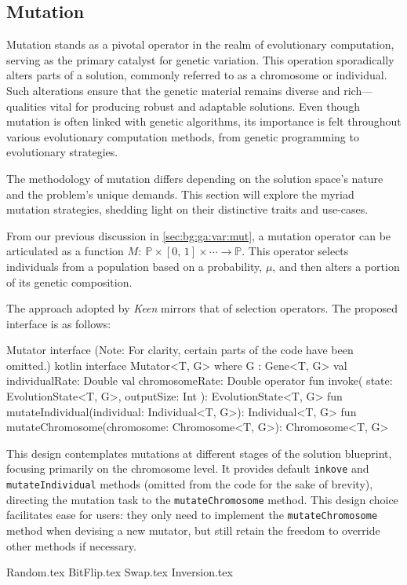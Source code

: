\subsection{Mutation}
\label{sec:keen:op:mut}
  Mutation stands as a pivotal operator in the realm of evolutionary 
  computation, serving as the primary catalyst for genetic variation.
  This operation sporadically alters parts of a solution, commonly referred to 
  as a chromosome or individual. Such alterations ensure that the genetic 
  material remains diverse and rich—qualities vital for producing robust and 
  adaptable solutions. Even though mutation is often linked with genetic 
  algorithms, its importance is felt throughout various evolutionary 
  computation methods, from genetic programming to evolutionary strategies.

  The methodology of mutation differs depending on the solution space's nature 
  and the problem's unique demands. This section will explore the myriad 
  mutation strategies, shedding light on their distinctive traits and use-cases.

  From our previous discussion in \vref{sec:bg:ga:var:mut}, a mutation operator 
  can be articulated as a function \(M :\: \mathbb{P} \times [0,\, 1] \times 
  \cdots \to \mathbb{P}\). This operator selects individuals from a population 
  based on a probability, \(\mu\), and then alters a portion of its genetic 
  composition.

  The approach adopted by \textit{Keen} mirrors that of selection operators. 
  The proposed interface is as follows:

  \begin{code}{
    Mutator interface (Note: For clarity, certain parts of the code have been omitted.)
  }{}{kotlin}
    interface Mutator<T, G> where G : Gene<T, G> {
        val individualRate: Double
        val chromosomeRate: Double
        operator fun invoke(
            state: EvolutionState<T, G>, outputSize: Int
        ): EvolutionState<T, G>
        fun mutateIndividual(individual: Individual<T, G>): Individual<T, G>
        fun mutateChromosome(chromosome: Chromosome<T, G>): Chromosome<T, G>
    }
  \end{code}

  This design contemplates mutations at different stages of the solution 
  blueprint, focusing primarily on the chromosome level. It provides default
  \texttt{inkove} and \texttt{mutateIndividual} methods (omitted from the code 
  for the sake of brevity), directing the mutation task to the 
  \texttt{mutateChromosome} method. This design choice facilitates ease for
  users: they only need to implement the \texttt{mutateChromosome} method when
  devising a new mutator, but still retain the freedom to override other methods 
  if necessary.

  {Random.tex}
  {BitFlip.tex}
  {Swap.tex}
  {Inversion.tex}
